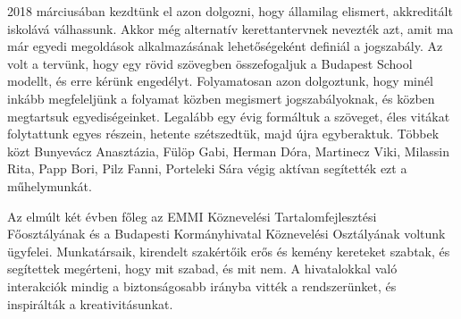  
2018 márciusában kezdtünk el azon dolgozni, hogy államilag elismert,
akkreditált iskolává válhassunk. Akkor még alternatív kerettantervnek
nevezték azt, amit ma már egyedi megoldások alkalmazásának
lehetőségeként definiál a jogszabály. Az volt a tervünk, hogy egy
rövid szövegben összefogaljuk a Budapest School modellt, és erre
kérünk engedélyt. Folyamatosan azon dolgoztunk, hogy minél inkább
megfeleljünk a folyamat közben megismert jogszabályoknak, és közben
megtartsuk egyediségeinket. Legalább egy évig formáltuk a szöveget,
éles vitákat folytattunk egyes részein, hetente szétszedtük, majd újra
egyberaktuk. Többek közt Bunyevácz Anasztázia, Fülöp Gabi, Herman
Dóra, Martinecz Viki, Milassin Rita, Papp Bori, Pilz Fanni, Porteleki
Sára végig aktívan segítették ezt a műhelymunkát.

 
Az elmúlt két évben főleg az EMMI Köznevelési Tartalomfejlesztési
Főosztályának és a Budapesti Kormányhivatal Köznevelési Osztályának
voltunk ügyfelei. Munkatársaik, kirendelt szakértőik erős és kemény
kereteket szabtak, és segítettek megérteni, hogy mit szabad, és mit nem.
A hivatalokkal való interakciók mindig a biztonságosabb
irányba vitték a rendszerünket, és inspirálták a kreativitásunkat.

